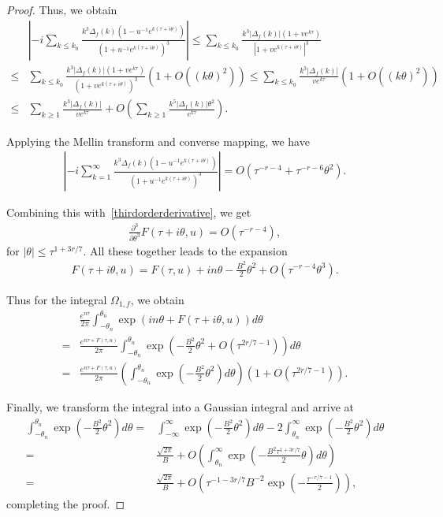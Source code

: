 \documentclass[12pt, oneside,reqno]{amsart}
\numberwithin{equation}{section}
\begin{document}
\begin{proof}
\noindent
Thus, we obtain
\begin{align*}
&\left|-i\sum_{k\leq k_0}\frac{k^3\Delta_f(k)(1-u^{-1}e^{k(\tau+i\theta)})}{(1+u^{-1}e^{k(\tau+i\theta)})^3}\right| 
\leq\sum_{k\leq k_0}\frac{k^3|\Delta_f(k)|(1+ve^{k\tau})}{|1+ve^{k(\tau+i\theta)}|^3}\\
\leq&\sum_{k\leq k_0}\frac{k^3|\Delta_f(k)|(1+ve^{k\tau})}{(1+ve^{k(\tau+i\theta)})^3}\left(1+O((k\theta)^2)\right)
\leq \sum_{k\leq k_0}\frac{k^3|\Delta_f(k)|}{ve^{k\tau}}\left(1+O((k\theta)^2)\right)\\
\leq&\sum_{k\geq 1}\frac{k^3|\Delta_f(k)|}{ve^{k\tau}}+O\left(\sum_{k\geq 1}\frac{k^5|\Delta_f(k)|\theta^2}{e^{k\tau}}\right).
\end{align*}

\noindent
Applying the Mellin transform and converse mapping, we have
\begin{align*}
\left|-i\sum_{k=1}^{\infty}\frac{k^3\Delta_f(k)(1-u^{-1}e^{k(\tau+i\theta)})}{(1+u^{-1}e^{k(\tau+i\theta)})^3}\right|
=O\left(\tau^{-r-4}+\tau^{-r-6}\theta^2\right).
\end{align*}

\noindent
Combining this with~\eqref{thirdorderderivative}, we get
\begin{align*}
\frac{\partial^3}{\partial\theta^3}F(\tau+i\theta,u)
=O(\tau^{-r-4}),
\end{align*}
for $|\theta|\leq\tau^{1+3r/7}$. All these together leads to the expansion
\begin{align*}
F(\tau+i\theta,u)
=F(\tau,u)+in\theta-\frac{B^2}{2}\theta^2+O(\tau^{-r-4}\theta^3).
\end{align*}

\noindent
Thus for the integral $\Omega_{1,f}$, we obtain
\begin{align*}
&\frac{e^{n\tau}}{2\pi}\int_{-\theta_n}^{\theta_n}\exp(in\theta+F(\tau+i\theta,u))d\theta\\
=&\frac{e^{n\tau+F(\tau,u)}}{2\pi}\int_{-\theta_n}^{\theta_n}\exp\left(-\frac{B^2}{2}\theta^2+O(\tau^{2r/7-1})\right)d\theta\\
=&\frac{e^{n\tau+F(\tau,u)}}{2\pi}\left(\int_{-\theta_n}^{\theta_n}\exp\left(-\frac{B^2}{2}\theta^2\right)d\theta\right)\left(1+O(\tau^{2r/7-1})\right).
\end{align*}

\noindent
Finally, we transform the integral into a Gaussian integral and arrive at
\begin{align*}
\int_{-\theta_n}^{\theta_n}\exp\left(-\frac{B^2}{2}\theta^2\right)d\theta
=&\int_{-\infty}^{\infty}\exp\left(-\frac{B^2}{2}\theta^2\right)d\theta
-2\int_{\theta_n}^{\infty}\exp\left(-\frac{B^2}{2}\theta^2\right)d\theta\\
=&\frac{\sqrt{2\pi}}{B}+O\left(\int_{\theta_n}^{\infty}\exp\left(-\frac{B^2\tau^{1+3r/7}}{2}\theta\right)d\theta\right)\\
=&\frac{\sqrt{2\pi}}{B}+O\left(\tau^{-1-3r/7}B^{-2}\exp\left(-\frac{\tau^{-r/7-1}}{2}\right)\right),
\end{align*}
completing the proof.
\end{proof}
\end{document}
